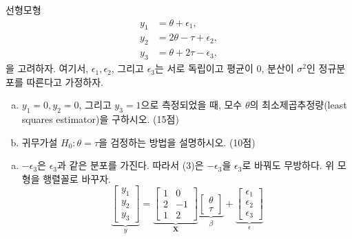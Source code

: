 \documentclass[answers]{exam}
\begin{document}
\newpage
{}
\begin{questions}
   \question
   선형모형
   \begin{align}
    y_{1} &= \theta + \epsilon_{1},\\
    y_{2} &= 2\theta -\tau +\epsilon_{2},\\
    y_{3} &= \theta+2\tau-\epsilon_{3},
   \end{align}
   을 고려하자. 여기서, $\epsilon_{1},\epsilon_{2}$, 그리고 $\epsilon_{3}$는 서로 독립이고 평균이 $0$, 분산이 $\sigma^{2}$인 정규분포를 따른다고 가정하자.
   \begin{enumerate}[(a)]
    \item $y_{1}=0,y_{2}=0$, 그리고 $y_{3}=1$으로 측정되었을 때, 모수 $\theta$의 최소제곱추정량(least squares estimator)을 구하시오. (15점)
    \item 귀무가설 $H_{0}:\theta=\tau$을 검정하는 방법을 설명하시오. (10점)
   \end{enumerate}
   \begin{solution}
    \begin{enumerate}[(a)]
      \item $-\epsilon_{3}$은 $\epsilon_{3}$과 같은 분포를 가진다. 따라서 (3)은 $-\epsilon_{3}$을 $\epsilon_{3}$로 바꿔도 무방하다. 위 모형을 행렬꼴로 바꾸자.
      \begin{equation}
        \underbrace{\begin{bmatrix}y_{1}\\y_{2}\\y_{3} \end{bmatrix}}_{y} = \underbrace{\begin{bmatrix}1&0\\ 2 & -1\\ 1 & 2 \end{bmatrix}}_{\mathbf{X}}\underbrace{\begin{bmatrix}\theta \\ \tau \end{bmatrix}}_{\beta} + \underbrace{\begin{bmatrix}\epsilon_{1}\\ \epsilon_{2} \\ \epsilon_{3} \end{bmatrix}}_{\epsilon}
      \end{equation}

\end{enumerate}
\end{solution}
\end{questions}
\end{document}

